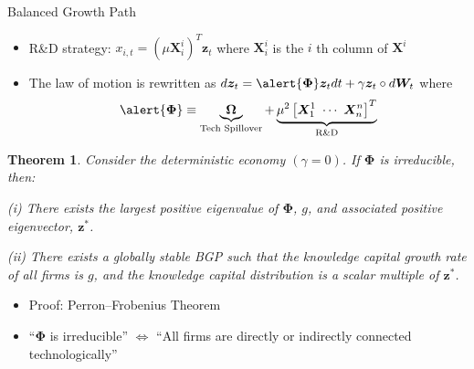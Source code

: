 \documentclass[
  10pt,
  aspectratio=169,   %
]{beamer}
\theoremstyle{plain}
\newtheorem*{thm*}{Theorem}
\begin{document}
\begin{frame}{Balanced Growth Path}
  \begin{itemize}
    \item R\&D strategy: $x_{i,t}=\left(\mu \bm{X}_{i}^{i}\right)^{T}\bm{z}_{t}$ where $\bm{X}_{i}^{i}$ is the $i$ th column of $\bm{X}^{i}$
    \item The law of motion is rewritten as $d\bm{z}_{t}=\alert{\bm{\Phi}}\bm{z}_{t}dt+\gamma\bm{z}_{t} \circ d\bm{W}_{t}$ where
    \[
      \alert{\bm{\Phi}}\equiv\underbrace{\bm{\Omega}}_{\text{Tech Spillover}}+\underbrace{\mu^{2}\left[\bm{X}_{1}^{1} \ \cdots \ \bm{X}_{n}^{n}\right]^{T}}_{\text{R\&D}}
    \]
    \vspace{-5mm}
  \end{itemize}
  \begin{thm*}
    Consider the deterministic economy $(\gamma=0)$. If \alert{$\bm{\Phi}$} is irreducible, then:

    (i) There exists the largest positive eigenvalue of \alert{$\bm{\Phi}$}, $g$, and associated positive eigenvector, $\bm{z}^{*}$.

    (ii) There exists a globally stable BGP such that the knowledge capital growth rate of all firms is $g$, and the knowledge capital distribution is a scalar multiple of $\bm{z}^{*}$.
  \end{thm*}
  \begin{itemize}
    \item Proof: Perron--Frobenius Theorem
    \item ``\alert{$\bm{\Phi}$} is irreducible'' $\Longleftrightarrow$ ``All firms are directly or indirectly connected technologically''
  \end{itemize}
\end{frame}
\end{document}
